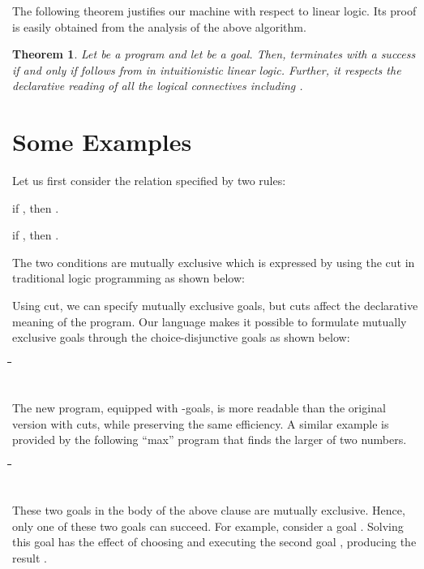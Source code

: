 \documentclass[letter]{ieice}
\newenvironment{numberedlist}
{\begin{list}{\makebox[20pt]{\hss(\arabic{itemno})\enspace}}
             {\usecounter{itemno}\labelwidth 20pt}}{\end{list}}
\newcounter{itemno}
\newcounter{itemno1}
\newcounter{itemno2}
\newcounter{lemma}
\newenvironment{exmple}{
 \begingroup \begin{tabbing} \hspace{2em}\= \hspace{3em}\= \hspace{3em}\=
\hspace{3em}\= \hspace{3em}\= \hspace{3em}\= \kill}{
 \end{tabbing}\endgroup}
\newtheorem{theorem}[lemma]{Theorem}
\begin{document}
The following theorem  justifies our machine with respect to linear logic.
Its proof is easily obtained from the analysis of the above algorithm.


\begin{theorem}
 Let  be a program and 
let  be a goal. Then,  terminates with a success
 if and only if  follows from
 in intuitionistic linear logic. Further, it respects the declarative
reading of all the logical connectives including .
\end{theorem}

\section{Some Examples }\label{sec:modules}

Let us first consider the relation  specified by two rules:

\begin{numberedlist}

\item if , then .

\item if , then .

\end{numberedlist}

The two  conditions are mutually exclusive which is expressed by using the cut in traditional logic
programming as shown below:




\noindent Using cut, we can specify mutually exclusive goals, but  cuts
affect the declarative meaning of the program. Our language makes it possible to formulate mutually exclusive goals
 through the choice-disjunctive goals as shown below:

\begin{exmple}
  \> \hspace{8em} \\
 \> \hspace{8em} \\
\end{exmple}
\noindent The new program, equipped with -goals, is more readable
than the original version with cuts, while preserving the same efficiency.
A similar example is provided by the 
following ``max'' program that finds the larger of two numbers.  

\begin{exmple}
  \> \hspace{9em} \\
 \> \hspace{9em} \\
\end{exmple}
\noindent These two goals in the body of the above clause are mutually exclusive. Hence, only one of these two goals
can  succeed.  For example, consider a goal .
Solving this goal  has the effect of choosing and executing the second goal , producing
the result .
 
\end{document}
